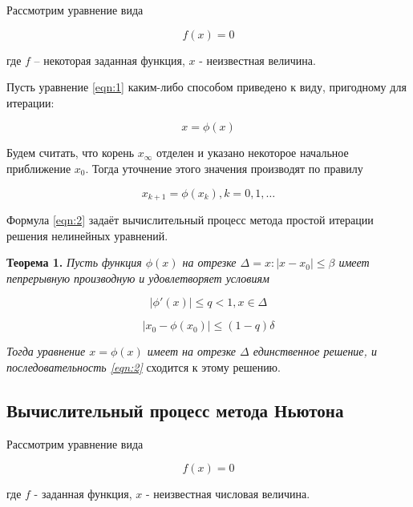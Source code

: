 \documentclass[12pt, a4paper]{article}
\begin{document}
	 Рассмотрим уравнение вида
	 
	 \begin{equation} \label{eqn:1}
	 f(x)=0
	 \end{equation}
	 
	 
	 где $f$ -- некоторая заданная функция, $x$ - неизвестная величина. 
	 
	 Пусть уравнение \eqref{eqn:1} каким-либо способом приведено к виду, пригодному для итерации:
	 
	 \begin{equation} 
	 x=\phi(x)
	 \end{equation}
	 
	 Будем считать, что корень $x_\infty$ отделен и указано некоторое начальное приближение $x_0$. Тогда уточнение этого значения производят по правилу
	 
	 \begin{equation} \label{eqn:2}
	 x_{k+1} = \phi(x_k), k=0,1,\dots
	 \end{equation}
	 
	 Формула \eqref{eqn:2} задаёт вычислительный процесс метода простой итерации решения нелинейных уравнений.
	 
	 \textbf{Теорема 1.} \textit{Пусть функция $\phi(x)$ на отрезке $\Delta = {x: |x-x_0| \leq \beta}$ имеет пепрерывную производную и удовлетворяет условиям}
	 
	 \begin{equation} \label{eqn:condition1}
	 	|\phi ' (x) | \leq q < 1, x \in \Delta
	 \end{equation}
	 
	 \begin{equation} \label{eqn:condition2}
	 	|x_0 - \phi(x_0)| \leq (1-q)\delta
	 \end{equation}
	 
	 \textit{Тогда уравнение $x=\phi(x)$ имеет на отрезке $\Delta$ единственное решение, и последовательность \eqref{eqn:2}} сходится к этому решению.
	 
	 \subsection{Вычислительный процесс метода Ньютона}
	 
	 Рассмотрим уравнение вида
	 
	 \begin{equation}
	 	f(x)=0
	 \end{equation}
	 
	 где $f$ - заданная функция, $x$ - неизвестная числовая величина.
	 
\end{document}
